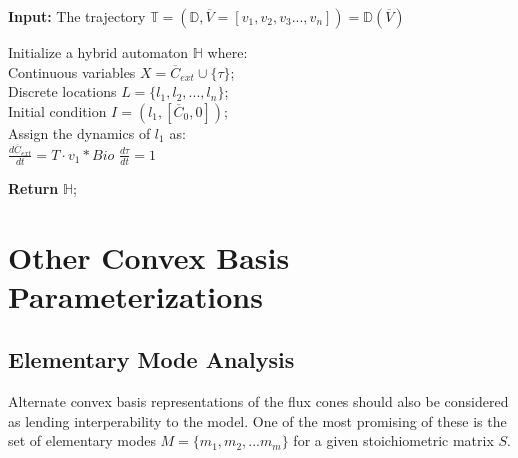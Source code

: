 \begin{algorithm*}[H]
\SetAlgoLined
 \textbf{Input:} The trajectory $\mathbb{T} = (\mathbb{D},\overline{V} = [v_1, v_2, v_3..., v_n]) = \mathbb{D}(\overline{V})$\;

 Initialize a hybrid automaton $\mathbb{H}$ where:\\ 
 \hspace*{10mm}Continuous variables $X = \overline{C}_{ext} \cup \{ \tau \}$;\ \\
  \hspace*{10mm}Discrete locations $L = \{ l_1, l_2, ..., l_n \}$;\ \\
  \hspace*{10mm}Initial condition  $I = (l_1,[\overline{C}_{0}, 0])$;\ \\
 \hspace*{10mm}Assign the dynamics of $l_1$ as:\\ 
                        \hspace*{20mm}$\frac{d\overline{C}_{ext}}{dt} = T \cdot v_1 * Bio$\;
                        \hspace*{20mm}$\frac{d\tau}{dt} = 1$\;
 
 \textbf{Return} $\mathbb{H}$;\
 \caption{Transformation of dFBA trajectory $\mathbb{D}(\overline{V})$ to hybrid automaton $\mathbb{H}(\mathbb{D},\overline{V})$}
 \label{Algo3}
\end{algorithm*}

\section{Other Convex Basis Parameterizations}

\subsection{Elementary Mode Analysis}

Alternate convex basis representations of the flux cones should also be considered as lending interperability to the model. One of the most promising of these is the set of elementary modes $M = \{ m_1, m_2, ... m_m \}$ for a given stoichiometric matrix $S$.